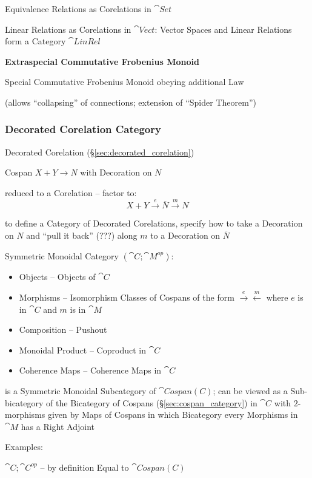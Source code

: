 Equivalence Relations as Corelations in $\cat{Set}$ %

Linear Relations as Corelations in $\cat{Vect}$:
Vector Spaces and Linear Relations form a Category $\cat{LinRel}$


\textbf{Extraspecial Commutative Frobenius Monoid}

Special Commutative Frobenius Monoid obeying additional Law

(allows ``collapsing'' of connections; extension of ``Spider
Theorem'')



\subsubsection{Decorated Corelation Category}
\label{sec:decorated_corelation_category}

Decorated Corelation (\S\ref{sec:decorated_corelation})

Cospan $X + Y \rightarrow N$ with Decoration on $N$

reduced to a Corelation -- factor to:
\[
  X + Y \xrightarrow{e} \overline{N} \xrightarrow{m} N
\]

to define a Category of Decorated Corelations, specify how to take a
Decoration on $N$ and ``pull it back'' (???) along $m$ to a Decoration
on $\overline{N}$

Symmetric Monoidal Category $(\cat{C}; \cat{M}^{op})$:
\begin{itemize}
  \item Objects -- Objects of $\cat{C}$
  \item Morphisms -- Isomorphism Classes of Cospans of the form
    $\xrightarrow{e}\xleftarrow{m}$ where $e$ is in $\cat{C}$ and $m$
    is in $\cat{M}$
  \item Composition -- Pushout
  \item Monoidal Product -- Coproduct in $\cat{C}$
  \item Coherence Maps -- Coherence Maps in $\cat{C}$
\end{itemize}
is a Symmetric Monoidal Subcategory of $\cat{Cospan(C)}$; can be
viewed as a Sub-bicategory of the Bicategory of Cospans
(\S\ref{sec:cospan_category}) in $\cat{C}$ with $2$-morphisms given by
Maps of Cospans in which Bicategory every Morphisms in $\cat{M}$ has a
Right Adjoint


Examples:

$\cat{C};\cat{C}^{op}$ -- by definition Equal to $\cat{Cospan(C)}$

